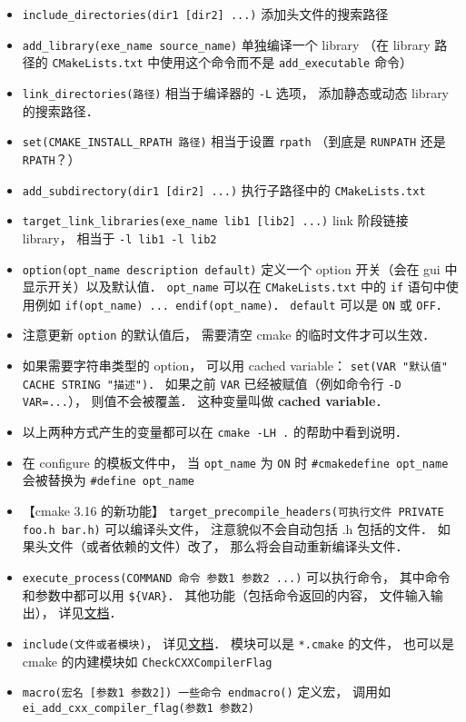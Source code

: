 \begin{itemize}
\item \verb`include_directories(dir1 [dir2] ...)` 添加头文件的搜索路径
\item \verb`add_library(exe_name source_name)` 单独编译一个 library （在 library 路径的 \verb|CMakeLists.txt| 中使用这个命令而不是 \verb`add_executable` 命令）
\item \verb|link_directories(路径)| 相当于编译器的 \verb`-L` 选项， 添加静态或动态 library 的搜索路径．
\item \verb|set(CMAKE_INSTALL_RPATH 路径)| 相当于设置 \verb|rpath| （到底是 \verb|RUNPATH| 还是 \verb|RPATH|？）
\item \verb`add_subdirectory(dir1 [dir2] ...)` 执行子路径中的 \verb|CMakeLists.txt|
\item \verb`target_link_libraries(exe_name lib1 [lib2] ...)` link 阶段链接 library， 相当于 \verb|-l lib1 -l lib2|
\item \verb`option(opt_name description default)` 定义一个 option 开关（会在 gui 中显示开关）以及默认值． \verb`opt_name` 可以在 \verb|CMakeLists.txt| 中的 \verb`if` 语句中使用例如 \verb`if(opt_name) ... endif(opt_name)`． \verb`default` 可以是 \verb`ON` 或 \verb`OFF`．
\item 注意更新 \verb|option| 的默认值后， 需要清空 cmake 的临时文件才可以生效．
\item 如果需要字符串类型的 option， 可以用 cached variable： \verb|set(VAR "默认值" CACHE STRING "描述")|． 如果之前 \verb|VAR| 已经被赋值（例如命令行 \verb|-D VAR=...|）， 则值不会被覆盖． 这种变量叫做 \textbf{cached variable}．
\item 以上两种方式产生的变量都可以在 \verb|cmake -LH .| 的帮助中看到说明．
\item 在 configure 的模板文件中， 当 \verb`opt_name` 为 \verb`ON` 时 \verb`#cmakedefine opt_name` 会被替换为 \verb`#define opt_name`
\item 【cmake 3.16 的新功能】 \verb|target_precompile_headers(可执行文件 PRIVATE foo.h bar.h)| 可以编译头文件， 注意貌似不会自动包括 .h 包括的文件． 如果头文件（或者依赖的文件）改了， 那么将会自动重新编译头文件．
\item \verb|execute_process(COMMAND 命令 参数1 参数2 ...)| 可以执行命令， 其中命令和参数中都可以用 \verb|${VAR}|． 其他功能（包括命令返回的内容， 文件输入输出）， 详见\href{https://cmake.org/cmake/help/latest/command/execute_process.html}{文档}．
\item \verb|include(文件或者模块)|， 详见\href{https://cmake.org/cmake/help/latest/command/include.html}{文档}． 模块可以是 \verb|*.cmake| 的文件， 也可以是 cmake 的内建模块如 \verb|CheckCXXCompilerFlag|
\item \verb|macro(宏名 [参数1 参数2]) 一些命令 endmacro()| 定义宏， 调用如 \verb|ei_add_cxx_compiler_flag(参数1 参数2)|
\end{itemize}

